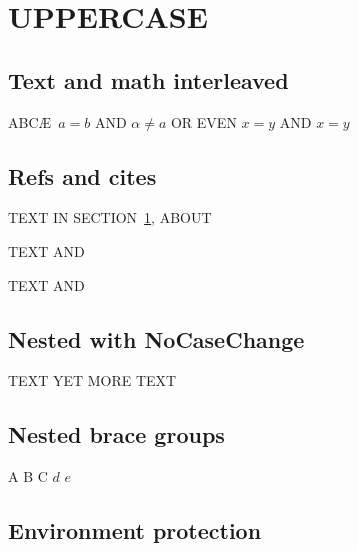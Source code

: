 \documentclass{article}
\begin{document}
\section{\MakeTextUppercase{Uppercase}}\label{intro}

\subsection{Text and math interleaved}

\MakeTextUppercase{abc\ae\ \( a = b \) and $\alpha \neq a$
or even \ensuremath{x=y} and $\ensuremath{x=y}$}

\subsection{Refs and cites}

\MakeTextUppercase{%
Text in section~\ref{intro}, about \cite[pp 2--4]{bbb}}

\MakeTextUppercase{%
Text \cite{bbb} and \cite{ccc}}

{\renewcommand\citeform{\MakeUppercase}\MakeTextUppercase{%
Text \cite{bbb} and \cite{ccc}}}

\subsection{Nested with NoCaseChange}

\MakeTextUppercase{%
Text  yet more text}


\subsection{Nested brace groups}

\MakeTextUppercase{a b {c $d$} $e$}

\subsection{Environment protection}
\end{document}
